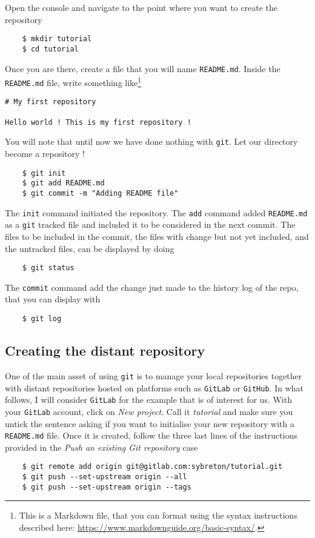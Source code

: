 \documentclass{article}
\begin{document}
Open the console and navigate to the point where you want to create the repository
\begin{lstlisting}
    $ mkdir tutorial
    $ cd tutorial
\end{lstlisting}
Once you are there, create a file that you will name \texttt{README.md}. Inside the \texttt{README.md} file, write something like\footnote{This is a Markdown file, that you can format using the syntax instructions described here: \url{https://www.markdownguide.org/basic-syntax/}.}
\begin{lstlisting}
# My first repository

Hello world ! This is my first repository !
\end{lstlisting}
You will note that until now we have done nothing with \texttt{git}. Let our directory become a repository !
\begin{lstlisting}
    $ git init
    $ git add README.md
    $ git commit -m "Adding README file"
\end{lstlisting}
The \texttt{init} command initiated the repository. The \texttt{add} command added \texttt{README.md} as a \texttt{git} tracked file and included it to be considered in the next commit. The files to be included in the commit, the files with change but not yet included, and the untracked files, can be displayed by doing
\begin{lstlisting}
    $ git status
\end{lstlisting}
The \texttt{commit} command add the change just made to the history log of the repo, that you can display with 
\begin{lstlisting}
    $ git log
\end{lstlisting}

\subsection{Creating the distant repository}

One of the main asset of using \texttt{git} is to manage your local repositories together with distant repositories hosted on platforms such as \texttt{GitLab} or \texttt{GitHub}. In what follows, I will consider \texttt{GitLab} for the example that is of interest for us.
With your \texttt{GitLab} account, click on \textit{New project}. Call it \textit{tutorial} and make sure you untick the sentence asking if you want to initialise your new repository with a \texttt{README.md} file.
Once it is created, follow the three last lines of the instructions provided in the \textit{Push an existing Git repository} case
\begin{lstlisting}
    $ git remote add origin git@gitlab.com:sybreton/tutorial.git
    $ git push --set-upstream origin --all
    $ git push --set-upstream origin --tags
\end{lstlisting}
\end{document}
